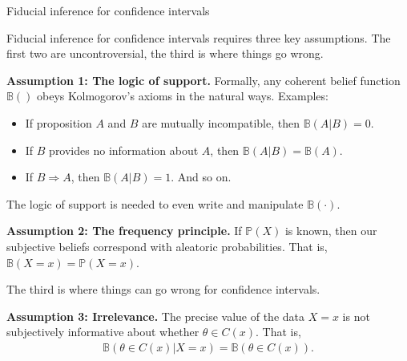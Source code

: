 \documentclass[8pt]{beamer}\usepackage[]{graphicx}\usepackage[]{color}
\def\p#1{\mathbb{P}\left(#1\right)}
\def\b#1{\mathbb{B}\left(#1\right)}
\begin{document}
\begin{frame}{Fiducial inference for confidence intervals}

Fiducial inference for confidence intervals requires three key assumptions.
The first two are uncontroversial, the third is where things go wrong.

\pause

\textbf{Assumption 1: The logic of support.}  Formally, any coherent belief
function $\b{}$ obeys Kolmogorov's axioms in the natural ways. Examples:
\begin{itemize}
    \item If proposition $A$ and $B$ are mutually incompatible, then $\b{A | B} = 0$.
    \item If $B$ provides no information about $A$, then $\b{A | B} = \b{A}$.
    \item If $B \Rightarrow A$, then $\b{A | B} = 1$.  And so on.
\end{itemize}

The logic of support is needed to even write and manipulate $\b{\cdot}$.

\pause

\textbf{Assumption 2: The frequency principle.}  If $\p{X}$ is known, then our
subjective beliefs correspond with aleatoric probabilities.  That is,
$\b{X = x} = \p{X = x}$.

\pause

The third is where things can go wrong for confidence intervals.

\textbf{Assumption 3: Irrelevance.} The precise value of the data $X=x$ is not
subjectively informative about whether $\theta \in C(x)$.  That is,
%
\begin{align*}
%
\b{\theta \in C(x) | X = x} = \b{\theta \in C(x)}.
%
\end{align*}
%
\end{frame}

\end{document}
